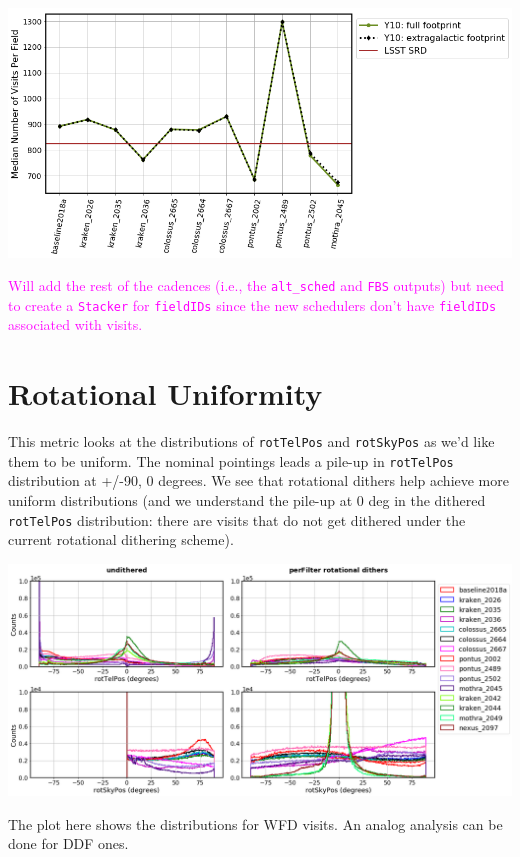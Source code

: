 \documentclass[a4paper,10pt]{article}
\newcommand{\ttt}[1]{\texttt{#1}}
\newcommand{\cl}[1]{\textcolor{magenta}{#1}}
\begin{document}
\begin{minipage}{\columnwidth}
\vspace*{2em}
\centering
\includegraphics[width=.9\columnwidth]{lss_compare_median_nvisits_11dbs.png}
\vspace*{2em}
\end{minipage}

\cl{Will add the rest of the cadences (i.e., the \ttt{alt\_sched} and \ttt{FBS} outputs) but need to create a \ttt{Stacker} for \ttt{fieldIDs} since the new schedulers don't have \ttt{fieldIDs} associated with visits.}


\newpage
\section*{Rotational Uniformity\label{rotational dithers}}
This metric looks at the distributions of \ttt{rotTelPos} and \ttt{rotSkyPos} as we'd like them to be uniform. The nominal pointings leads a pile-up in \ttt{rotTelPos} distribution at +/-90, 0 degrees. We see that rotational dithers help achieve more uniform distributions (and we understand the pile-up at 0 deg in the dithered \ttt{rotTelPos} distribution: there are visits that do not get dithered under the current rotational dithering scheme).

\begin{minipage}{\columnwidth}
\vspace*{2em}
\centering
\includegraphics[width=\columnwidth]{lss_compare_rotDiths_15dbs.png}
\vspace*{2em}
\end{minipage}
The plot here shows the distributions for WFD visits. An analog analysis can be done for DDF ones.
\end{document}
